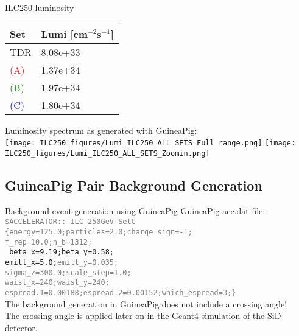 \documentclass[xcolor={dvipsnames}]{beamer}
\begin{document}
\begin{frame}{ILC250 luminosity}
 \begin{table}
\label{tab:Parameters}
\centering
\begin{tabularx}{0.35\textwidth}{ll}
\hline\hline
\textbf{Set}  & Lumi [cm$^{-2}$s$^{-1}$] \\
\hline
\cline{1-2}
\hline
 TDR & 8.08e+33\\
 \textcolor{Red}{(A)} &  1.37e+34 \\
 \textcolor{Green}{(B)} & 1.97e+34 \\
 \textcolor{Blue}{(C)} & 1.80e+34 \\
\hline\hline
\end{tabularx}
\end{table}
Luminosity spectrum as generated with GuineaPig:\\\vspace*{0.1cm}
\texttt{[image: ILC250\_figures/Lumi\_ILC250\_ALL\_SETS\_Full\_range.png]}\hfill
\texttt{[image: ILC250\_figures/Lumi\_ILC250\_ALL\_SETS\_Zoomin.png]}
\end{frame}

\subsection{GuineaPig Pair Background Generation}
\begin{frame}{Background event generation using GuineaPig}
GuineaPig acc.dat file:\\
{\small\texttt{\textcolor{Gray}{\$ACCELERATOR:: ILC-250GeV-SetC \\                                                                            
\{energy=125.0;particles=2.0;charge\_sign=-1;\\
f\_rep=10.0;n\_b=1312;\\}
beta\_x=9.19;beta\_y=0.58;\\
emitt\_x=5.0;\textcolor{Gray}{emitt\_y=0.035;\\
sigma\_z=300.0;scale\_step=1.0;\\
waist\_x=240;waist\_y=240;\\
espread.1=0.00188;espread.2=0.00152;which\_espread=3;\}}
}}\\
\vspace*{0.3cm}
 The background generation in GuineaPig \alert{does not include a crossing angle}!\\
 The crossing angle is applied later on in the Geant4 simulation of the SiD detector.
\end{frame}
\end{document}
